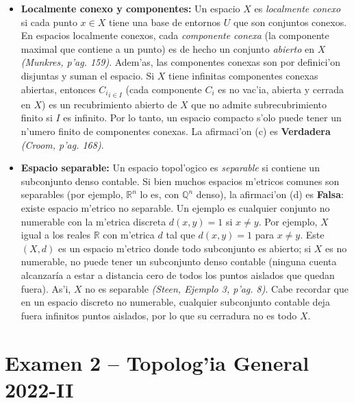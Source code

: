 \documentclass[a4paper,11pt]{article}  %
\begin{document}
\begin{enumerate}
\begin{itemize}
\item \textbf{Localmente conexo y componentes:} Un espacio $X$ es \emph{localmente conexo} si cada punto $x\in X$ tiene una base de entornos $U$ que son conjuntos conexos. En espacios localmente conexos, cada \emph{componente conexa} (la componente maximal que contiene a un punto) es de hecho un conjunto \emph{abierto} en $X$ \emph{(Munkres, p'ag. 159)}. Adem'as, las componentes conexas son por definici'on disjuntas y suman el espacio. Si $X$ tiene infinitas componentes conexas abiertas, entonces ${C_i}_{i\in I}$ (cada componente $C_i$ es no vac'ia, abierta y cerrada en $X$) es un recubrimiento abierto de $X$ que no admite subrecubrimiento finito si $I$ es infinito. Por lo tanto, un espacio compacto s'olo puede tener un n'umero finito de componentes conexas. La afirmaci'on (c) es \textbf{Verdadera} \emph{(Croom, p'ag. 168)}.
\item \textbf{Espacio separable:} Un espacio topol'ogico es \emph{separable} si contiene un subconjunto denso contable. Si bien muchos espacios m'etricos comunes son separables (por ejemplo, $\mathbb{R}^n$ lo es, con $\mathbb{Q}^n$ denso), la afirmaci'on (d) es \textbf{Falsa}: existe espacio m'etrico no separable. Un ejemplo es cualquier conjunto no numerable con la m'etrica discreta $d(x,y)=1$ si $x\neq y$. Por ejemplo, $X$ igual a los reales $\mathbb{R}$ con m'etrica $d$ tal que $d(x,y)=1$ para $x\neq y$. Este $(X,d)$ es un espacio m'etrico donde todo subconjunto es abierto; si $X$ es no numerable, no puede tener un subconjunto denso contable (ninguna cuenta alcanzaría a estar a distancia cero de todos los puntos aislados que quedan fuera). As'i, $X$ no es separable \emph{(Steen, Ejemplo 3, p'ag. 8)}. Cabe recordar que en un espacio discreto no numerable, cualquier subconjunto contable deja fuera infinitos puntos aislados, por lo que su cerradura no es todo $X$.
\end{itemize}
\end{enumerate} \section{Examen 2 -- Topolog'ia General 2022-II}
\end{document}
